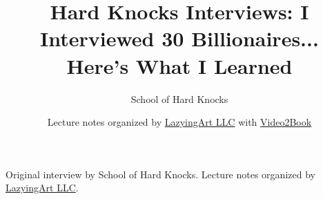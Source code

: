 \documentclass[11pt,oneside]{book}
\begin{document}
\frontmatter
\title{Hard Knocks Interviews: I Interviewed 30 Billionaires... Here's What I Learned}
\author{School of Hard Knocks}
\date{Lecture notes organized by \href{https://lazying.art}{LazyingArt LLC} with \href{https://github.com/lachlanchen/Video2Book}{Video2Book}}
\maketitle
\begin{center}
\small Original interview by School of Hard Knocks. Lecture notes organized by \href{https://lazying.art}{LazyingArt LLC}.
\end{center}
\clearpage
\mainmatter

\end{document}
